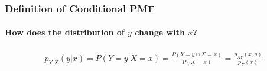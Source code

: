 \documentclass[handout]{beamer}
\date{Lecture \# 10}
\begin{document}
 


\begin{frame}[plain]
	\titlepage 
	

\end{frame} 

%
%
%
%
%
%
%
\begin{frame}
\frametitle{Definition of Conditional PMF}
\framesubtitle{How does the distribution of $y$ change with $x$?}

\begin{eqnarray*}
	p_{Y|X}(y|x) = P(Y=y|X=x) =  \frac{P(Y=y \cap X=x)}{P(X=x)} =  \frac{p_{XY}(x,y)}{p_X(x)}
\end{eqnarray*}
\vspace{1em}


\end{frame}
\end{document}

